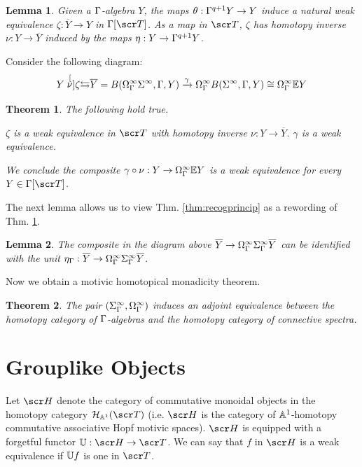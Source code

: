 \documentclass{amsart}
\newtheorem{thm}{Theorem}[section]
\newtheorem{lem}{Lemma}[section]
\theoremstyle{definition}
\begin{document}
\begin{lem}
Given a $\Gamma$-algebra $Y$, the maps $\theta:\Gamma^{q+1}Y \to Y$ induce a natural weak equivalence $\zeta: \overline{Y} \to Y$ in $\GA[\sT]$. As a map in $\sT$, $\zeta$ has homotopy inverse $\nu : Y \to \overline{Y}$ induced by the maps $\eta:Y \to \Gamma^{q+1}Y$.
\end{lem}

Consider the following diagram:
\[Y \stackrel[\nu]{\zeta}{\leftrightarrows} \overline{Y} = B(\Omega^{\infty}_{\Gamma}\Sigma^{\infty},\Gamma,Y) \xrightarrow{\gamma} \Omega^{\infty}_{\Gamma}B(\Sigma^{\infty}, \Gamma, Y) \cong \Omega^{\infty}_{\Gamma} \mathbb{E} Y\]

\begin{thm}\label{thm:recogprincipog}
The following hold true.
\begin{outline}
\1 $\zeta$ is a weak equivalence in $\sT$ with homotopy inverse $\nu : Y \to \overline{Y}$.
\1 $\gamma$ is a weak equivalence.
\end{outline}
We conclude the composite $\gamma \circ \nu : Y \to \Omega^{\infty}_{\Gamma}\mathbb{E} Y$ is a weak equivalence for every $Y \in \GA [\sT]$.
\end{thm}

The next lemma allows us to view Thm. \ref{thm:recogprincip} as a rewording of Thm. \ref{thm:recogprincipog}.

\begin{lem}
The composite in the diagram above $\overline{Y} \to \Omega^{\infty}_{\Gamma}\Sigma^{\infty}_{\Gamma}\overline{Y}$ can be identified with the unit $\eta_{\Gamma} : \overline{Y} \to \Omega^{\infty}_{\Gamma} \Sigma_{\Gamma}^{\infty}\overline{Y}$. 
\end{lem}

\noindent Now we obtain a motivic homotopical monadicity theorem.

\begin{thm}
The pair $(\Sigma^{\infty}_{\Gamma},\Omega^{\infty}_{\Gamma})$ induces an adjoint equivalence between the homotopy category of $\Gamma$-algebras and the homotopy category of connective spectra.
\end{thm}

\section{Grouplike Objects}\label{sec:gplike}
Let $\sH$ denote the category of commutative monoidal objects in the homotopy category $\oH_{\bA^1}(\sT)$ (i.e. $\sH$ is the category of $\mathbb{A}^1$-homotopy commutative associative Hopf motivic spaces). $\sH$ is equipped with a forgetful functor $\bU : \sH \to \sT$. We can say that $f$ in $\sH$ is a weak equivalence if $\mathbb{U} f$ is one in $\sT$.
\end{document}
